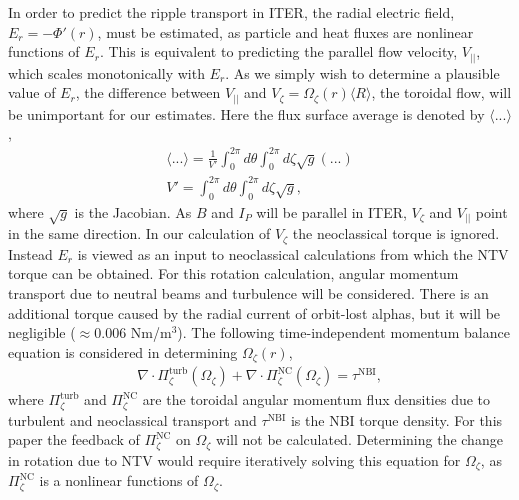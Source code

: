 \documentclass[aip, pop, preprint]{revtex4-1}
\numberwithin{figure}{section}
\numberwithin{equation}{section}
\begin{document}
In order to predict the ripple transport in ITER, the radial electric field, $E_r = - \Phi'(r) $, must be estimated, as particle and heat fluxes are nonlinear functions of $E_r$. This is equivalent to predicting the parallel flow velocity, $V_{||}$, which scales monotonically with $E_r$.  As we simply wish to determine a plausible value of $E_r$, the difference between $V_{||}$ and $V_{\zeta} = \Omega_{\zeta}(r) \langle R \rangle$, the toroidal flow, will be unimportant for our estimates. Here the flux surface average is denoted by $\langle ... \rangle$,
\begin{gather}
\langle ... \rangle = \frac{1}{V'} \int_0^{2 \pi} d \theta \int_0^{2 \pi} d \zeta \sqrt{g} (...)
\\ V' = \int_0^{2\pi} d \theta \int_0^{2 \pi} d \zeta \sqrt{g},
\end{gather}
where $\sqrt{g}$ is the Jacobian. As $B$ and $I_P$ will be parallel in ITER, $V_{\zeta}$ and $V_{||}$ point in the same direction.  In our calculation of $V_{\zeta}$ the neoclassical torque is ignored. Instead $E_r$ is viewed as an input to neoclassical calculations from which the NTV torque can be obtained. For this rotation calculation, angular momentum transport due to neutral beams and turbulence will be considered. There is an additional torque caused by the radial current of orbit-lost alphas,\cite{Rosenbluth1996} but it will be negligible ($\approx 0.006$ Nm/m$^3$). The following time-independent momentum balance equation is considered in determining $\Omega_{\zeta}(r)$,
\begin{gather}
\nabla \cdot \Pi_{\zeta}^{\text{turb}}(\Omega_{\zeta}) + \nabla \cdot \Pi_{\zeta}^{\text{NC}}(\Omega_{\zeta}) = \tau^{\text{NBI}},
\end{gather}
where $\Pi^{\text{turb}}_{\zeta}$ and $\Pi^{\text{NC}}_{\zeta}$ are the toroidal angular momentum flux densities due to turbulent and neoclassical transport and $\tau^{\text{NBI}}$ is the NBI torque density. For this paper the feedback of $\Pi_{\zeta}^{\text{NC}}$ on $\Omega_{\zeta}$ will not be calculated. Determining the change in rotation due to NTV would require iteratively solving this equation for $\Omega_{\zeta}$, as $\Pi_{\zeta}^{\text{NC}}$ is a nonlinear functions of $\Omega_{\zeta}$. 
\end{document}
